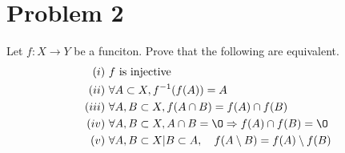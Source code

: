 \documentclass{article}
\theoremstyle{definition}
\begin{document}
\section*{Problem 2}
    Let $f: X \rightarrow Y$ be a funciton. Prove that the following are equivalent.
    \begin{align*}
        (i) \ & f \text{ is injective } \\
        (ii) \ & \forall A \subset X, f^{-1}(f(A)) = A \\
        (iii) \ & \forall A,B \subset X, f(A \cap B) = f(A) \cap f(B) \\
        (iv) \ & \forall A,B \subset X, A \cap B = \O \Rightarrow f(A) \cap f(B) = \O \\
        (v) \ & \forall A,B \subset X | B \subset A, \ \ \ f(A \setminus B) = f(A) \setminus f(B)
    \end{align*}
\end{document}
